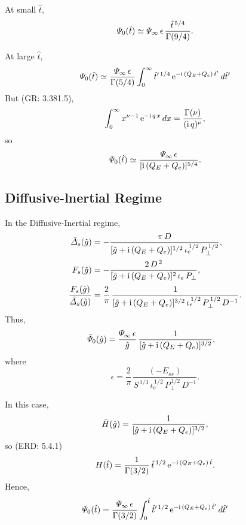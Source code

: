 \documentclass[titlepage=false,12pt]{article}
\begin{document}
At small $\hat{t}$,
\begin{equation}
{\mit\Psi}_0(\hat{t}) \simeq {\mit\Psi}_\infty\,\epsilon\,\frac{\hat{t}^{\,5/4}}{\Gamma(9/4)}.
\end{equation}

At large $\hat{t}$, 
\begin{equation}
{\mit\Psi}_0(\hat{t}) \simeq\frac{{\mit\Psi}_{\infty}\,\epsilon}{\Gamma(5/4)}\int_0^\infty
\hat{t}'^{\,1/4}\,{\rm e}^{-{\rm i}\,(Q_E+Q_e)\,\hat{t}'}\,d\hat{t}'
\end{equation}
But (GR: 3.381.5), 
\begin{equation}
\int_0^\infty x^{\nu-1}\,{\rm e}^{-{\rm i}\,q\,x}\,dx = \frac{\Gamma(\nu)}{({\rm i}\,q)^{\nu}},
\end{equation}
so 
\begin{equation}
{\mit\Psi}_0(\hat{t}) \simeq \frac{{\mit\Psi}_\infty\,\epsilon}{[{\rm i}\,(Q_E+Q_e)]^{5/4}}.
\end{equation}

\subsection{Diffusive-lnertial Regime}
In the Diffusive-Inertial regime, 
\begin{align}
\hat{\mit\Delta}_s(\hat{g})& = -\frac{\pi\,D}{[\hat{g}+{\rm i}\,(Q_E+Q_e)]^{1/2}\,\iota_e^{\,1/2}\,P_\perp^{\,1/2}},\\[0.5ex]
F_s(\hat{g})&=-\frac{2\,D^{\,2}}{[\hat{g}+{\rm i}\,(Q_E+Q_e)]^{2}\,\iota_e\,P_\perp},\\[0.5ex]
\frac{F_s(\hat{g})}{\hat{\mit\Delta}_s(\hat{g})}&=\frac{2}{\pi}\, \frac{1}{[\hat{g}+{\rm i}\,(Q_E+Q_e)]^{3/2}\,\iota_e^{\,1/2}\,P_\perp^{\,1/2}\,D^{-1}}.
\end{align}
Thus,
\begin{align}
\bar{\mit\Psi}_0(\hat{g}) &=\frac{{\mit\Psi}_\infty\,\epsilon}{\hat{g}}\,\frac{1}{[\hat{g}+{\rm i}\,(Q_E+Q_e)]^{3/2}},
\end{align}
where
\begin{equation}
\epsilon = \frac{2}{\pi}\,\frac{(-E_{ss})}{S^{\,1/3}\,\iota_e^{\,1/2}\,P_\perp^{\,1/2}\,D^{-1}}.
\end{equation}

In this case,
\begin{equation}
\bar{H}(\hat{g}) = \frac{1}{[\hat{g}+{\rm i}\,(Q_E+Q_e)]^{3/2}},
\end{equation}
so (ERD: 5.4.1)
\begin{equation}
H(\hat{t}) = \frac{1}{\Gamma(3/2)}\,\hat{t}^{\,1/2}\,{\rm e}^{-{\rm i}\,(Q_E+Q_e)\,\hat{t}}.
\end{equation}
Hence,
\begin{equation}
{\mit\Psi}_0(\hat{t}) =\frac{{\mit\Psi}_\infty\,\epsilon}{\Gamma(3/2)}\int_0^{\hat{t}}
\hat{t}'^{\,1/2}\,{\rm e}^{-{\rm i}\,(Q_E+Q_e)\,\hat{t}'}\,d\hat{t}'
\end{equation}
\end{document}
